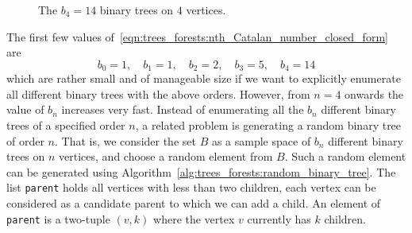\begin{figure}[!htbp]
{}
\qquad
{}
\qquad
{}
\qquad
{}
\qquad
{}
\caption{The $b_4 = 14$ binary trees on $4$ vertices.}
\label{fig:trees_forests:binary_trees_4_vertices}
\end{figure}

The first few values
of~\eqref{eqn:trees_forests:nth_Catalan_number_closed_form} are
\[
b_0 = 1,\quad
b_1 = 1,\quad
b_2 = 2,\quad
b_3 = 5,\quad
b_4 = 14
\]
which are rather small and of manageable size if we want to explicitly
enumerate all different binary trees with the above orders. However,
from $n = 4$ onwards the value of $b_n$ increases very fast. Instead
of enumerating all the $b_n$ different binary trees of a specified
order $n$, a related problem is generating a random binary tree of
order $n$. That is, we consider the set $B$ as a
sample space of $b_n$ different binary
trees on $n$ vertices, and choose a random
element from $B$. Such a random element can be
generated using
Algorithm~\ref{alg:trees_forests:random_binary_tree}. The list
\texttt{parent} holds all vertices with less than two children, each
vertex can be considered as a candidate parent to which we can add a
child. An element of \texttt{parent} is a two-tuple $(v, k)$ where the
vertex $v$ currently has $k$ children.

